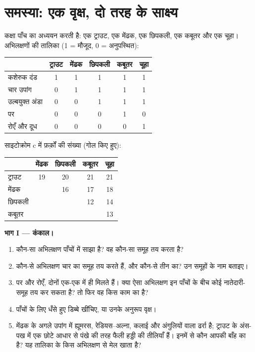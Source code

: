 \section{समस्या: एक वृक्ष, दो तरह के साक्ष्य}

\begin{problem}
\label{pb:g10:common-ancestry:1}
कक्षा पाँच  का अध्ययन करती है: एक ट्राउट, एक मेंढक, एक
छिपकली, एक कबूतर और एक चूहा। अभिलक्षणों की तालिका (1 = मौजूद, 0 =
अनुपस्थित):

\begin{center}
\begin{tabular}{lccccc}
 & ट्राउट & मेंढक & छिपकली & कबूतर & चूहा \\ \hline
कशेरुक दंड & 1 & 1 & 1 & 1 & 1 \\
चार उपांग & 0 & 1 & 1 & 1 & 1 \\
उल्बयुक्त अंडा & 0 & 0 & 1 & 1 & 1 \\
पर & 0 & 0 & 0 & 1 & 0 \\
रोएँ और दूध & 0 & 0 & 0 & 0 & 1 \\
\end{tabular}
\end{center}

साइटोक्रोम c में फ़र्क़ों की संख्या (गोल किए हुए):

\begin{center}
\begin{tabular}{lcccc}
 & मेंढक & छिपकली & कबूतर & चूहा \\ \hline
ट्राउट & 19 & 20 & 21 & 21 \\
मेंढक & & 16 & 17 & 18 \\
छिपकली & & & 12 & 14 \\
कबूतर & & & & 13 \\
\end{tabular}
\end{center}

\medskip
\noindent\textbf{भाग I --- कंकाल।}
\begin{enumerate}
  \item कौन-सा अभिलक्षण पाँचों में साझा है? वह कौन-सा समूह तय करता है?
  \item कौन-से अभिलक्षण चार का समूह तय करते हैं, और कौन-से तीन का? उन
        समूहों के नाम बताइए।
  \item पर और रोएँ, दोनों एक-एक  में ही मिलते हैं। क्या ऐसा
        अभिलक्षण इन पाँचों के बीच कोई नातेदारी-समूह तय कर सकता है? तो
        फिर वह किस काम का है?
  \item पाँचों  के लिए धँसे हुए डिब्बे खींचिए, या उनके अनुरूप
        वृक्ष।
  \item मेंढक के अगले उपांग में ह्यूमरस, रेडियस--अल्ना, कलाई और
        अंगुलियों वाला ढर्रा है; ट्राउट के अंस-पख में एक छोटे आधार से
        पंखे की तरह फैली हड्डी की तीलियाँ हैं। इनमें से कौन आपकी बाँह का
         है? यह तालिका के किस अभिलक्षण से मेल खाता है?
\end{enumerate}


\end{problem}
